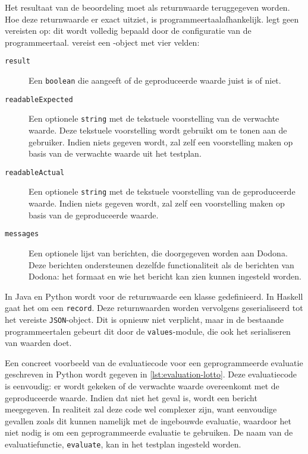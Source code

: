 Het resultaat van de beoordeling moet als returnwaarde teruggegeven worden.
Hoe deze returnwaarde er exact uitziet, is programmeertaalafhankelijk.
\tested{} legt geen vereisten op: dit wordt volledig bepaald door de configuratie van de programmeertaal.
\tested{} vereist een -object met vier velden:

\begin{description}
    \item[\texttt{result}] Een \texttt{boolean} die aangeeft of de geproduceerde waarde juist is of niet.
    \item[\texttt{readableExpected}] Een optionele \texttt{string} met de tekstuele voorstelling van de verwachte waarde.
    Deze tekstuele voorstelling wordt gebruikt om te tonen aan de gebruiker.
    Indien niets gegeven wordt, zal \tested{} zelf een voorstelling maken op basis van de verwachte waarde uit het testplan.
    \item[\texttt{readableActual}] Een optionele \texttt{string} met de tekstuele voorstelling van de geproduceerde waarde.
    Indien niets gegeven wordt, zal \tested{} zelf een voorstelling maken op basis van de geproduceerde waarde.
    \item[\texttt{messages}] Een optionele lijst van berichten, die doorgegeven worden aan Dodona.
    Deze berichten ondersteunen dezelfde functionaliteit als de berichten van Dodona: het formaat en wie het bericht kan zien kunnen ingesteld worden.
\end{description}

In Java en Python wordt voor de returnwaarde een klasse gedefinieerd.
In Haskell gaat het om een \texttt{record}.
Deze returnwaarden worden vervolgens geserialiseerd tot het vereiste \texttt{JSON}-object.
Dit is opnieuw niet verplicht, maar in de bestaande programmeertalen gebeurt dit door de \texttt{values}-module, die ook het serialiseren van waarden doet.

Een concreet voorbeeld van de evaluatiecode voor een geprogrammeerde evaluatie geschreven in Python wordt gegeven in \cref{lst:evaluation-lotto}.
Deze evaluatiecode is eenvoudig: er wordt gekeken of de verwachte waarde overeenkomt met de geproduceerde waarde.
Indien dat niet het geval is, wordt een bericht meegegeven.
In realiteit zal deze code wel complexer zijn, want eenvoudige gevallen zoals dit kunnen namelijk met de ingebouwde evaluatie, waardoor het niet nodig is om een geprogrammeerde evaluatie te gebruiken.
De naam van de evaluatiefunctie, \texttt{evaluate}, kan in het testplan ingesteld worden.

